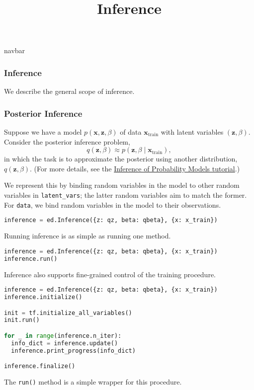 \title{Inference}

{{navbar}}

\subsubsection{Inference}

We describe the general scope of inference.

\subsubsection{Posterior Inference}

Suppose we have a model $p(\mathbf{x}, \mathbf{z}, \beta)$ of data $\mathbf{x}_{\text{train}}$ with latent variables $(\mathbf{z}, \beta)$.
Consider the posterior inference problem,
\begin{equation*}
q(\mathbf{z}, \beta)\approx p(\mathbf{z}, \beta\mid \mathbf{x}_{\text{train}}),
\end{equation*}
in which the task is to approximate the posterior using another
distribution, $q(\mathbf{z},\beta)$. (For more details, see the
\href{/tutorials/inference} {Inference of Probability Models
tutorial}.)

We represent this by binding random variables in the model to other
random variables in \texttt{latent_vars}; the latter random variables
aim to match the former. For \texttt{data}, we bind random variables
in the model to their observations.

\begin{lstlisting}[language=Python]
inference = ed.Inference({z: qz, beta: qbeta}, {x: x_train})
\end{lstlisting}

Running inference is as simple as running one method.
\begin{lstlisting}[language=Python]
inference = ed.Inference({z: qz, beta: qbeta}, {x: x_train})
inference.run()
\end{lstlisting}
%
Inference also supports fine-grained control of the training procedure.
%
\begin{lstlisting}[language=Python]
inference = ed.Inference({z: qz, beta: qbeta}, {x: x_train})
inference.initialize()

init = tf.initialize_all_variables()
init.run()

for _ in range(inference.n_iter):
  info_dict = inference.update()
  inference.print_progress(info_dict)

inference.finalize()
\end{lstlisting}
The \texttt{run()} method is a simple wrapper for this procedure.

